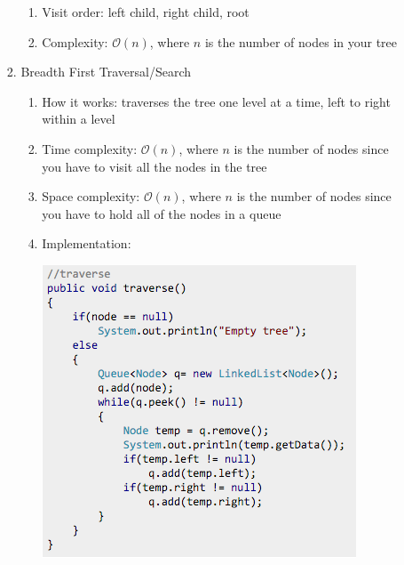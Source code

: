 \documentclass [12pt, executivepaper]{article}
\begin{document}
\begin{enumerate}
\begin{enumerate}
\begin{enumerate}
\begin{enumerate}

\item Visit order: left child, right child, root

\item Complexity: $\mathcal{O}(n)$, where $n$ is the number of nodes in your tree

\end{enumerate}

\item Breadth First Traversal/Search

\begin{enumerate}

\item How it works: traverses the tree one level at a time, left to right within a level 

\item Time complexity: $\mathcal{O}(n)$, where $n$ is the number of nodes since you have to visit all the nodes in the tree

\item Space complexity: $\mathcal{O}(n)$, where $n$ is the number of nodes since you have to hold all of the nodes in a queue

\item Implementation:

\vspace{1mm}

\includegraphics[scale=0.5]{BreadthFirstTraversalForTree}

\end{enumerate}

\end{enumerate}


\end{enumerate}
\end{enumerate}
\end{document}
